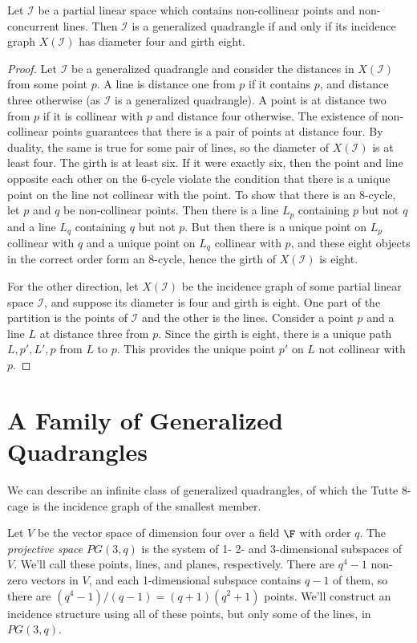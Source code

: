 \begin{theorem}
	Let $\mathcal{I}$ be a partial linear space which contains non-collinear points and non-concurrent lines.  Then $\mathcal{I}$ is a generalized quadrangle if and only if its incidence graph $X(\mathcal{I})$ has diameter four and girth eight.
\end{theorem}
\begin{proof}
	Let $\mathcal{I}$ be a generalized quadrangle and consider the distances in $X(\mathcal{I})$ from some point $p$.  A line is distance one from $p$ if it contains $p$, and distance three otherwise (as $\mathcal{I}$ is a generalized quadrangle).  A point is at distance two from $p$ if it is collinear with $p$ and distance four otherwise.  The existence of non-collinear points guarantees that there is a pair of points at distance four.  By duality, the same is true for some pair of lines, so the diameter of $X(\mathcal{I})$ is at least four.  The girth is at least six.  If it were exactly six, then the point and line opposite each other on the 6-cycle violate the condition that there is a unique point on the line not collinear with the point.  To show that there is an 8-cycle, let $p$ and $q$ be non-collinear points.  Then there is a line $L_p$ containing $p$ but not $q$ and a line $L_q$ containing $q$ but not $p$.  But then there is a unique point on $L_p$ collinear with $q$ and a unique point on $L_q$ collinear with $p$, and these eight objects in the correct order form an 8-cycle, hence the girth of $X(\mathcal{I})$ is eight.
	
	For the other direction, let $X(\mathcal{I})$ be the incidence graph of some partial linear space $\mathcal{I}$, and suppose its diameter is four and girth is eight.  One part of the partition is the points of $\mathcal{I}$ and the other is the lines.  Consider a point $p$ and a line $L$ at distance three from $p$.  Since the girth is eight, there is a unique path $L,p',L',p$ from $L$ to $p$.  This provides the unique point $p'$ on $L$ not collinear with $p$.
\end{proof}

\section*{A Family of Generalized Quadrangles}

We can describe an infinite class of generalized quadrangles, of which the Tutte 8-cage is the incidence graph of the smallest member.  

Let $V$ be the vector space of dimension four over a field $\F$ with order $q$.  The \textit{projective space} $PG(3,q)$ is the system of 1- 2- and 3-dimensional subspaces of $V$.  We'll call these points, lines, and planes, respectively.  There are $q^4-1$ non-zero vectors in $V$, and each 1-dimensional subspace contains $q-1$ of them, so there are $(q^4-1)/(q-1)=(q+1)(q^2+1)$ points.  We'll construct an incidence structure using all of these points, but only some of the lines, in $PG(3,q)$.

